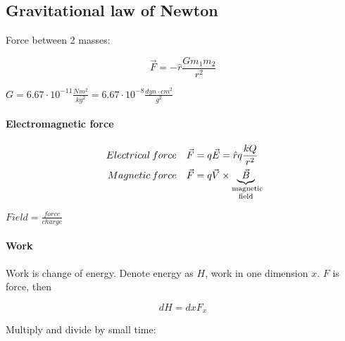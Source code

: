 \subsection{Gravitational law of Newton}

Force between 2 masses:

$$\vec{F} = -\hat{r} \frac{G m_1 m_2}{r^2}$$

$G = 6.67 \cdot 10^{-11} \frac{Nm^2}{kg^2} = 6.67 \cdot 10^{-8} \frac{dyn \cdot cm^2}{g^2}$ 

\paragraph{Electromagnetic force}

\begin{align*}
Electrical \: force \quad&\vec{F} = q \vec{E} = \hat{r} q \frac{kQ}{r^2} \\
Magnetic \: force \quad&\vec{F} = q \vec{V} \times \underbrace{\vec{B}}_{\parbox{1cm}{\scriptsize  \centering magnetic\\ field}} \\
\end{align*}

$Field = \frac{force}{charge}$


\paragraph{Work}

Work is change of energy. Denote energy as $H$, work in one dimension $x$. $F$ is force, then

$$dH = dx F_x$$

Multiply and divide by small time:

